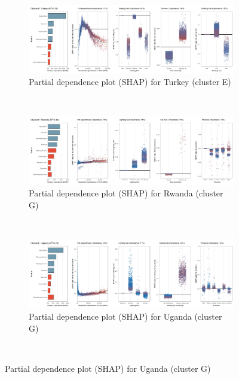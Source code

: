 \begin{figure}[ht!]\ContinuedFloat
    \centering
   \begin{subfigure}[b]{\textwidth}
     \centering
         \caption{Partial dependence plot (SHAP) for Turkey (cluster E)}
         \label{fig:5b_TUR}
         \includegraphics[width=\textwidth]{Figure 5b/Figure_5b_TUR}      
        \end{subfigure}
    \\
    \vspace{0.5cm}
   \begin{subfigure}[b]{\textwidth}
   \centering
         \caption{Partial dependence plot (SHAP) for Rwanda (cluster G)}
         \label{fig:5b_RWA}
         \includegraphics[width=\textwidth]{Figure 5b/Figure_5b_RWA}          
     \end{subfigure}
    \\
    \vspace{0.5cm}
   \begin{subfigure}[b]{\textwidth} 
   \centering
         \caption{Partial dependence plot (SHAP) for Uganda (cluster G)}
         \label{fig:5b_UGA}
         \includegraphics[width=\textwidth]{Figure 5b/Figure_5b_UGA}
    \end{subfigure}
    \\
    \vspace{0.5cm}


\end{figure}
